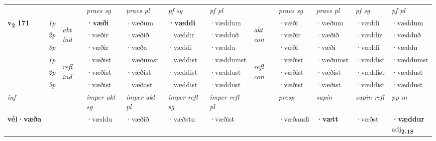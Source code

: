 \begin{longtable}[l]{X>{\footnotesize\itshape}llXXXXlXXXX}
 & &   & \textit{praes sg}  & \textit{praes pl}    & \textit{ pf sg} & \textit{pf pl} & & \textit{praes sg}  & \textit{praes pl}    & \textit{pf sg} & \textit{pf pl }  \\ \cmidrule{4-7} \cmidrule{9-12}
 \multirow{2}{*}{{{\textbf{v{\textsubscript{2}}} \Large{\textbf{171}}}}}  & 1p & \multirow{3}{*}{\begin{turn}{90}\textit{akt ind}\end{turn}} & \textbf{·væði} & ·væðum & \textbf{·væddi} & ·væddum & \multirow{3}{*}{\begin{turn}{90}\textit{akt con}\end{turn}} &·væði & ·væðum & ·væddi & ·væddum\\*
 & 2p &  &  ·væðir  & ·væðið & ·væddir & ·vædduð & & ·væðir & ·væðið & ·væddir & ·vædduð \\*
 & 3p &  & ·væðir & ·væða & ·væddi & ·væddu & & ·væði & ·væði& ·væddi & ·væddu \\*
\cmidrule{4-7} \cmidrule{9-12}
 & 1p & \multirow{3}{*}{\begin{turn}{90}\textit{refl ind}\end{turn}}  & ·væðist & ·væðumst & ·væddist & ·væddumst & \multirow{3}{*}{\begin{turn}{90}\textit{refl con}\end{turn}}  &·væðist & ·væðumst & ·væddist & ·væddumst \\*
 & 2p &  & ·væðist & ·væðist & ·væddist & ·væddust & &·væðist & ·væðist & ·væddist & ·væddust \\*
 & 3p  & & ·væðist & ·væðast & ·væddist & ·væddust & & ·væðist & ·væðist& ·væddist & ·væddust \\*
\cmidrule{4-7} \cmidrule{9-12}

   {\textit{inf}} & &  & \textit{imper akt sg} & \textit{imper akt pl} & \textit{imper refl sg} & \textit{imper refl pl} && \textit{presp} & \textit{supin} & \textit{supin refl} & \textit{pp m} \\*
  {\textbf{vél\allowbreak ·væða}} & && ·væddu  & ·væðið & ·væðstu & ·væðist && ·væðandi &  \textbf{·vætt} & ·væðst & \specialcell{\textbf{·væddur} \\ adj\textbf{\textsubscript{2-18}}} \\*

\midrule


\end{longtable}
